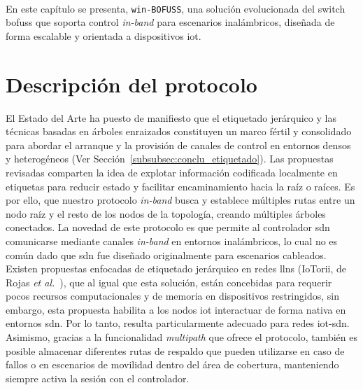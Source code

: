 \\
En este capítulo se presenta, \texttt{win-BOFUSS}, una solución evolucionada del switch \gls{bofuss} que soporta control \textit{in-band} para escenarios inalámbricos, diseñada de forma escalable y orientada a dispositivos \gls{iot}.

\section{Descripción del protocolo}
\label{sec:inband_proto_desc}
El Estado del Arte ha puesto de manifiesto que el etiquetado jerárquico y las técnicas basadas en árboles enraizados constituyen un marco fértil y consolidado para abordar el arranque y la provisión de canales de control en entornos densos y heterogéneos (Ver Sección~\ref{subsubsec:conclu_etiquetado}). Las propuestas revisadas comparten la idea de explotar información codificada localmente en etiquetas para reducir estado y facilitar encaminamiento hacia la raíz o raíces. Es por ello, que nuestro protocolo \textit{in-band} busca y establece múltiples rutas entre un nodo raíz y el resto de los nodos de la topología, creando múltiples árboles conectados. La novedad de este protocolo es que permite al controlador \gls{sdn} comunicarse mediante canales \textit{in-band} en entornos inalámbricos, lo cual no es común dado que \gls{sdn} fue diseñado originalmente para escenarios cableados. 
Existen propuestas enfocadas de etiquetado jerárquico en redes \gls{llns} (IoTorii, de Rojas \textit{et al.}~\cite{rojas2021outperforming}), que al igual que esta solución, están concebidas para requerir pocos recursos computacionales y de memoria en dispositivos restringidos, sin embargo, esta propuesta habilita a los nodos \gls{iot} interactuar de forma nativa en entornos \gls{sdn}. Por lo tanto, resulta particularmente adecuado para redes \gls{iot}-\gls{sdn}. Asimismo, gracias a la funcionalidad \textit{multipath} que ofrece el protocolo, también es posible almacenar diferentes rutas de respaldo que pueden utilizarse en caso de fallos o en escenarios de movilidad dentro del área de cobertura, manteniendo siempre activa la sesión con el controlador.\\
\\
